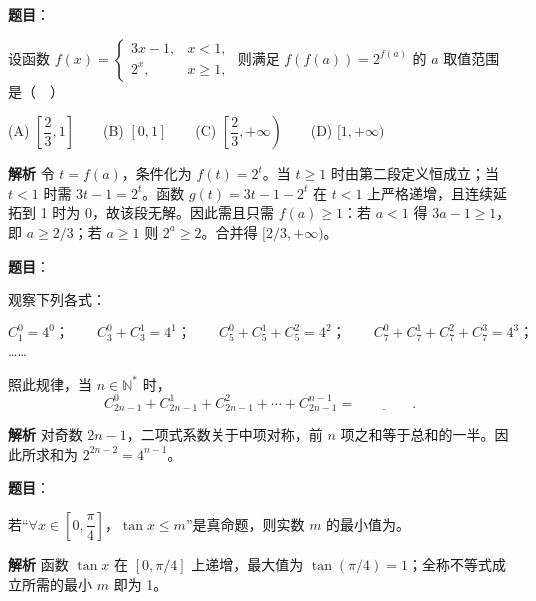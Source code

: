 \begin{answer}

\textbf{题目}：

设函数 $f(x)=\begin{cases}3x-1,&x<1,\\2^x,&x\geqslant 1,\end{cases}$ 则满足 $f(f(a))=2^{f(a)}$ 的 $a$ 取值范围是（　）

(A) $\left[\dfrac{2}{3},1\right]$　　(B) $[0,1]$　　(C) $\left[\dfrac{2}{3},+\infty\right)$　　(D) $[1,+\infty)$

\textbf{解析}
令 $t=f(a)$，条件化为 $f(t)=2^t$。当 $t\ge1$ 时由第二段定义恒成立；当 $t<1$ 时需 $3t-1=2^t$。函数 $g(t)=3t-1-2^t$ 在 $t<1$ 上严格递增，且连续延拓到 1 时为 0，故该段无解。因此需且只需 $f(a)\ge1$：若 $a<1$ 得 $3a-1\ge1$，即 $a\ge2/3$；若 $a\ge1$ 则 $2^a\ge2$。合并得 $[2/3,+\infty)$。

\gkanswer{答案：C，$\left[\dfrac{2}{3},+\infty\right)$}

\end{answer}
\begin{answer}

\textbf{题目}：

观察下列各式：

\nopagebreak[4]
\[
C_{1}^{0}=4^0\text{；}\qquad
C_{3}^{0}+C_{3}^{1}=4^1\text{；}\qquad
C_{5}^{0}+C_{5}^{1}+C_{5}^{2}=4^2\text{；}\qquad
C_{7}^{0}+C_{7}^{1}+C_{7}^{2}+C_{7}^{3}=4^3\text{；}
\]
……

照此规律，当 $n\in\mathbb{N}^*$ 时，
\nopagebreak[4]
\[
C_{2n-1}^{0}+C_{2n-1}^{1}+C_{2n-1}^{2}+\cdots+C_{2n-1}^{n-1}=\underline{\qquad\qquad}.
\]

\textbf{解析}
对奇数 $2n-1$，二项式系数关于中项对称，前 $n$ 项之和等于总和的一半。因此所求和为 $2^{2n-2}=4^{n-1}$。


\end{answer}
\begin{answer}

\textbf{题目}：

若“$\forall x\in\left[0,\dfrac{\pi}{4}\right]$，$\tan x\leqslant m$”是真命题，则实数 $m$ 的最小值为\gkblank{}。

\textbf{解析}
函数 $\tan x$ 在 $[0,\pi/4]$ 上递增，最大值为 $\tan(\pi/4)=1$；全称不等式成立所需的最小 $m$ 即为 1。


\end{answer}
